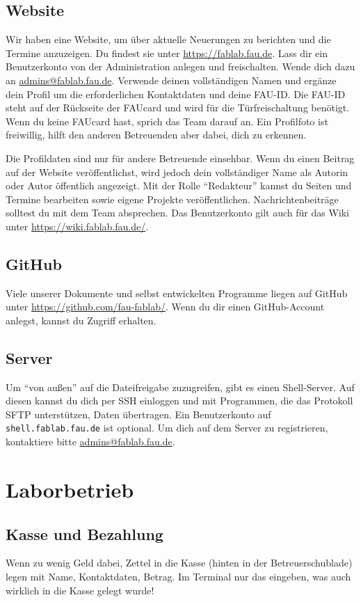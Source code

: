 \documentclass{\basedir/fablab-document}
\begin{document}
\subsection{Website}
Wir haben eine Website, um über aktuelle Neuerungen zu berichten und die Termine anzuzeigen.
Du findest sie unter \url{https://fablab.fau.de}.
Lass dir ein Benutzerkonto von der Administration anlegen und freischalten.
Wende dich dazu an \href{mailto:admins@fablab.fau.de}{admins@fablab.fau.de}.
Verwende deinen vollständigen Namen und ergänze dein Profil um die erforderlichen Kontaktdaten
und deine FAU-ID. Die FAU-ID steht auf der Rückseite der FAUcard und wird für die Türfreischaltung
benötigt. Wenn du keine FAUcard hast, sprich das Team darauf an. Ein Profilfoto ist freiwillig,
hilft den anderen Betreuenden aber dabei, dich zu erkennen.

Die Profildaten sind nur für andere Betreuende einsehbar. Wenn du einen Beitrag auf der Website
veröffentlichst, wird jedoch dein vollständiger Name als Autorin oder Autor öffentlich angezeigt.
Mit der Rolle \enquote{Redakteur} kannst du Seiten und Termine bearbeiten sowie eigene Projekte
veröffentlichen. Nachrichtenbeiträge solltest du mit dem Team absprechen.
Das Benutzerkonto gilt auch für das Wiki unter \url{https://wiki.fablab.fau.de/}.

\subsection{GitHub}
Viele unserer Dokumente und selbst entwickelten Programme liegen auf GitHub unter \url{https://github.com/fau-fablab/}.
Wenn du dir einen GitHub-Account anlegst, kannst du Zugriff erhalten.

\subsection{Server}
Um \enquote{von außen} auf die Dateifreigabe zuzugreifen, gibt es einen Shell-Server.
Auf diesen kannst du dich per SSH einloggen und mit Programmen, die das Protokoll SFTP unterstützen, Daten übertragen.
Ein Benutzerkonto auf \texttt{shell.fablab.fau.de} ist optional.
Um dich auf dem Server zu registrieren, kontaktiere bitte
\href{mailto:admins@fablab.fau.de}{admins@fablab.fau.de}.

\section{Laborbetrieb}
\subsection{Kasse und Bezahlung}
Wenn zu wenig Geld dabei, Zettel in die Kasse (hinten in der Betreuerschublade) legen mit Name, Kontaktdaten, Betrag.
Im Terminal nur das eingeben, was auch wirklich in die Kasse gelegt wurde!
\end{document}
